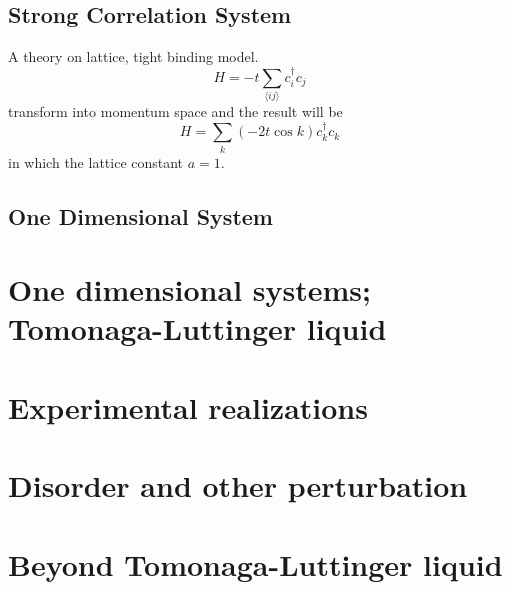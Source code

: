 \documentclass{article}
\begin{document}
\subsection{Strong Correlation System}
A theory on lattice, tight binding model.
$$
H = -t\sum_{\langle ij\rangle}c^\dagger_i c_j
$$
transform into momentum space and the result will be
$$
H = \sum_k (-2t\cos{k})c^\dagger_kc_k
$$
in which the lattice constant $a = 1$.
\subsection{One Dimensional System}

\section{One dimensional systems; Tomonaga-Luttinger liquid}

\section{Experimental realizations}

\section{Disorder and other perturbation}

\section{Beyond Tomonaga-Luttinger liquid}
\end{document}
